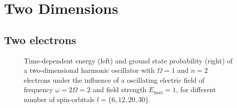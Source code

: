 \vfill
\pagebreak


\section{Two Dimensions}
\label{app:supp_2d_qd_results}

\subsection*{Two electrons}

\begin{figure}[!h]
    \centering
    \caption{Time-dependent energy (left) and ground state probability (right)
        of a two-dimensional harmonic oscillator with $\Omega=1$
        and $n=2$ electrons under the influence of a oscillating electric field 
        of frequency $\omega = 2 \Omega = 2$ and field strength $E_\text{max}=1$,
        for different number of spin-orbitals $l=\{6,12,20,30\}$.
    }
    \label{fig:2d_n2_qd}
\end{figure}


